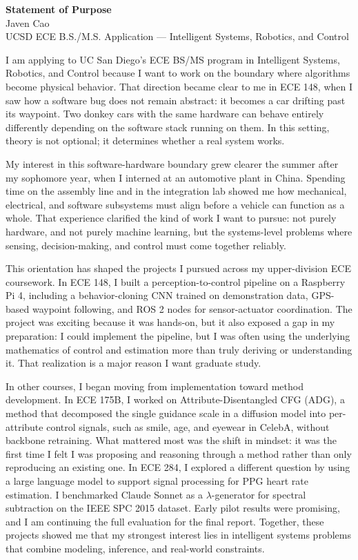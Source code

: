 \documentclass[12pt]{article}
\begin{document}
\begin{center}
  {\large\textbf{Statement of Purpose}}\\[0.4em]
  Javen Cao\\
  UCSD ECE B.S./M.S. Application --- Intelligent Systems, Robotics, and Control
\end{center}

\vspace{0.6em}

I am applying to UC San Diego's ECE BS/MS program in Intelligent Systems, Robotics, and Control because I want to work on the boundary where algorithms become physical behavior. That direction became clear to me in ECE 148, when I saw how a software bug does not remain abstract: it becomes a car drifting past its waypoint. Two donkey cars with the same hardware can behave entirely differently depending on the software stack running on them. In this setting, theory is not optional; it determines whether a real system works.

My interest in this software-hardware boundary grew clearer the summer after my sophomore year, when I interned at an automotive plant in China. Spending time on the assembly line and in the integration lab showed me how mechanical, electrical, and software subsystems must align before a vehicle can function as a whole. That experience clarified the kind of work I want to pursue: not purely hardware, and not purely machine learning, but the systems-level problems where sensing, decision-making, and control must come together reliably.

This orientation has shaped the projects I pursued across my upper-division ECE coursework. In ECE 148, I built a perception-to-control pipeline on a Raspberry Pi 4, including a behavior-cloning CNN trained on demonstration data, GPS-based waypoint following, and ROS 2 nodes for sensor-actuator coordination. The project was exciting because it was hands-on, but it also exposed a gap in my preparation: I could implement the pipeline, but I was often using the underlying mathematics of control and estimation more than truly deriving or understanding it. That realization is a major reason I want graduate study.

In other courses, I began moving from implementation toward method development. In ECE 175B, I worked on Attribute-Disentangled CFG (ADG), a method that decomposed the single guidance scale in a diffusion model into per-attribute control signals, such as smile, age, and eyewear in CelebA, without backbone retraining. What mattered most was the shift in mindset: it was the first time I felt I was proposing and reasoning through a method rather than only reproducing an existing one. In ECE 284, I explored a different question by using a large language model to support signal processing for PPG heart rate estimation. I benchmarked Claude Sonnet as a $\lambda$-generator for spectral subtraction on the IEEE SPC 2015 dataset. Early pilot results were promising, and I am continuing the full evaluation for the final report. Together, these projects showed me that my strongest interest lies in intelligent systems problems that combine modeling, inference, and real-world constraints.
\end{document}

